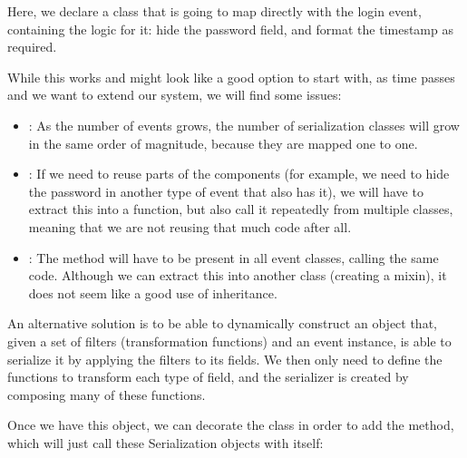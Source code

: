 \documentclass[a4paper,10pt,english]{sphinxmanual}
\begin{document}
Here, we declare a class that is going to map directly with the login event, containing the
logic for it: hide the password field, and format the timestamp as required.

While this works and might look like a good option to start with, as time passes and we
want to extend our system, we will find some issues:
\begin{itemize}
\item {} 
: As the number of events grows, the number of serialization classes will grow in the same order of magnitude, because they are mapped one to one.

\item {} 
: If we need to reuse parts of the components (for example, we need to hide the password in another type of event that also has it), we will have to extract this into a function, but also call it repeatedly from multiple classes, meaning that we are not reusing that much code after all.

\item {} 
: The  method will have to be present in all event classes, calling the same code. Although we can extract this into another class (creating a mixin), it does not seem like a good use of inheritance.

\end{itemize}

An alternative solution is to be able to dynamically construct an object that, given a set of
filters (transformation functions) and an event instance, is able to serialize it by applying
the filters to its fields. We then only need to define the functions to transform each type of
field, and the serializer is created by composing many of these functions.

Once we have this object, we can decorate the class in order to add the 
method, which will just call these Serialization objects with itself:
\end{document}

